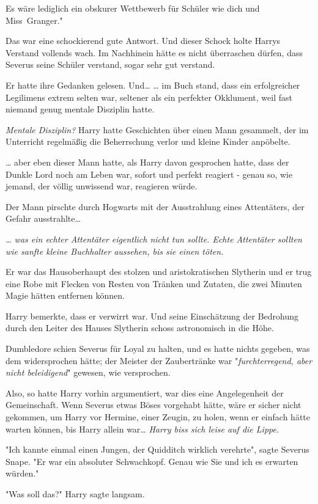 {Es wäre lediglich ein obskurer Wettbewerb für Schüler wie dich und Miss~Granger."

Das war eine schockierend gute Antwort. Und dieser Schock holte Harrys Verstand vollends wach. Im Nachhinein hätte es nicht überraschen dürfen, dass Severus seine Schüler verstand, sogar sehr gut verstand.

Er hatte ihre Gedanken gelesen. Und… … im Buch stand, dass ein erfolgreicher Legilimens extrem selten war, seltener als ein perfekter Okklument, weil fast niemand genug mentale Disziplin hatte.

\emph{Mentale Disziplin?} Harry hatte Geschichten über einen Mann gesammelt, der im Unterricht regelmäßig die Beherrschung verlor und kleine Kinder anpöbelte.

… aber eben dieser Mann hatte, als Harry davon gesprochen hatte, dass der Dunkle Lord noch am Leben war, sofort und perfekt reagiert - genau so, wie jemand, der völlig unwissend war, reagieren würde.

Der Mann pirschte durch Hogwarts mit der Ausstrahlung eines Attentäters, der Gefahr ausstrahlte…

\emph{… was ein echter Attentäter eigentlich nicht tun sollte. Echte Attentäter sollten wie sanfte kleine Buchhalter aussehen, bis sie einen töten.}

Er war das Hausoberhaupt des stolzen und aristokratischen Slytherin und er trug eine Robe mit Flecken von Resten von Tränken und Zutaten, die zwei Minuten Magie hätten entfernen können.

Harry bemerkte, dass er verwirrt war. Und seine Einschätzung der Bedrohung durch den Leiter des Hauses Slytherin schoss astronomisch in die Höhe.

Dumbledore schien Severus für Loyal zu halten, und es hatte nichts gegeben, was dem widersprochen hätte; der Meister der Zaubertränke war "\emph{furchterregend, aber nicht beleidigend}" gewesen, wie versprochen.

Also, so hatte Harry vorhin argumentiert, war dies eine Angelegenheit der Gemeinschaft. Wenn Severus etwas Böses vorgehabt hätte, wäre er sicher nicht gekommen, um Harry vor Hermine, einer Zeugin, zu holen, wenn er einfach hätte warten können, bis Harry allein war… \emph{Harry biss sich leise auf die Lippe.}

"Ich kannte einmal einen Jungen, der Quidditch wirklich verehrte", sagte Severus Snape. "Er war ein absoluter Schwachkopf. Genau wie Sie und ich es erwarten würden."

"Was soll das?" Harry sagte langsam.

}
